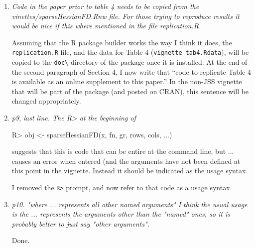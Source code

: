 \documentclass{article}
\newcommand{\proglang}[1]{\textsf{#1}}
\newcommand{\filename}[1]{\texttt{#1}}
\newcommand{\code}[1]{\texttt{#1}}
\newcommand{\func}[1]{\code{#1}}
\newenvironment{revQuote}{\itshape}{\vspace{\baselineskip}}
\newenvironment{response}{\normalfont}{\vspace{\baselineskip}}
\begin{document}
\begin{enumerate}[align=left]
\begin{response}
\end{response}


\item \begin{revQuote}
Code in the paper prior to table 4 needs to be copied from the
vinettes/sparseHessianFD.Rnw file. For those trying to reproduce results it
would be nice if this where mentioned in the file replication.R.
  \end{revQuote}

  \begin{response}
Assuming that the \proglang{R} package builder works the way I think it does,
the \filename{replication.R} file, and the data for Table 4 (\filename{vignette\_tab4.Rdata}), will be
copied to the \filename{doc\textbackslash} directory of the package
once it is installed.  At the end of the second paragraph of Section
4, I now write that ``code to replicate Table 4 is available as an
online supplement to this paper.'' In the non-JSS vignette that will be part
of the package (and posted on CRAN), this sentence will be changed appropriately.
\end{response}


\item \begin{revQuote}
p9, last line. The R> at the beginning of
 
   R> obj <- sparseHessianFD(x, fn, gr, rows, cols, ...)

suggests that this is code that can be entire at the command line, but ...
causes an error when entered (and the arguments have not been defined at
this point in the vignette. Instead it should be indicated as the usage
syntax.
  \end{revQuote}

\begin{response}
  I removed the \func{R>} prompt, and now refer to that code as a usage
  syntax.
\end{response}


\item \begin{revQuote}
p10. "where ... represents all other named arguments"
   I think the usual usage is the ... represents the arguments other than
the "named" ones, so it is probably better to just say "other arguments".
\end{revQuote}

\begin{response}
  Done.
\end{response}



\end{enumerate}
\end{document}
